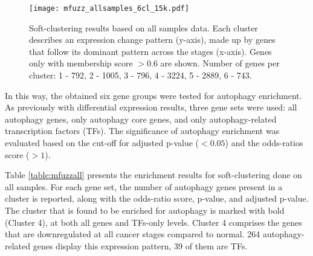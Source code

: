         
            \begin{figure}[!h]
            \centering
            \texttt{[image: mfuzz\_allsamples\_6cl\_15k.pdf]} 
            \caption[Soft-clustering results for all samples gene expression]{Soft-clustering results based on all samples data. Each cluster describes an expression change pattern (y-axis), made up by genes that follow its dominant pattern across the stages (x-axis). Genes only with membership score $>0.6$ are shown. Number of genes per cluster: 1 - 792, 2 - 1005, 3 - 796, 4 - 3224, 5 - 2889, 6 - 743.}
            \label{fig:mfuzzall}
            \end{figure}
            
        In this way, the obtained six gene groups were tested for autophagy enrichment. As previously with differential expression results, three gene sets were used: all autophagy genes, only autophagy core genes, and only autophagy-related transcription factors (TFs). The significance of autophagy enrichment was evaluated based on the cut-off for adjusted p-value ($<0.05$) and the odds-ratios score ($>1$).
        
        Table \ref{table:mfuzzall} presents the enrichment results for soft-clustering done on all samples. For each gene set, the number of autophagy genes present in a cluster is reported, along with the odds-ratio score, p-value, and adjusted p-value. The cluster that is found to be enriched for autophagy is marked with bold (Cluster 4), at both all genes and TFs-only levels. Cluster 4 comprises the genes that are downregulated at all cancer stages compared to normal. 264 autophagy-related genes display this expression pattern, 39 of them are TFs.
    

